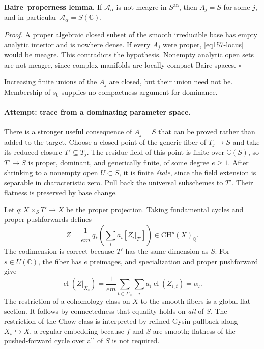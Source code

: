 \documentclass[11pt,a4paper]{article}
\newcommand{\Q}{\mathbb{Q}}
\newcommand{\C}{\mathbb{C}}
\numberwithin{equation}{section}
\begin{document}
\textbf{Baire--properness lemma.} If $\mathcal A_\alpha$ is not meagre in
$S^{\mathrm{an}}$, then $A_j=S$ for some $j$, and in particular
$\mathcal A_\alpha=S(\C)$.

\textit{Proof.} A proper algebraic closed subset of the smooth irreducible
base has empty analytic interior and is nowhere dense. If every $A_j$ were
proper, \eqref{eq157-locus} would be meagre. This contradicts the
hypothesis. Nonempty analytic open sets are not meagre, since complex
manifolds are locally compact Baire spaces. \hfill$\square$

Increasing finite unions of the $A_j$ are closed, but their union need not
be. Membership of $s_0$ supplies no compactness argument for dominance.

\paragraph{Attempt: trace from a dominating parameter space.}
There is a stronger useful consequence of $A_j=S$ that can be proved rather
than added to the target. Choose a closed point of the generic fiber of
$T_j\to S$ and take its reduced closure $T'\subseteq T_j$. The residue
field of this point is finite over $\C(S)$, so $T'\to S$ is proper,
dominant, and generically finite, of some degree $e\ge1$. After shrinking
to a nonempty open $U\subset S$, it is finite \emph{\'etale}, since the
field extension is separable in characteristic zero. Pull back the
universal subschemes to $T'$. Their flatness is preserved by base change.

Let $q:X\times_ST'\to X$ be the proper projection. Taking fundamental
cycles and proper pushforwards defines
\begin{equation}\label{eq157-trace}
 Z=\frac1{em}\,q_*\left(\sum_i a_i[Z_i|_{T'}]\right)
       \in\mathrm{CH}^p(X)_{\Q}.
\end{equation}
The codimension is correct because $T'$ has the same dimension as $S$.
For $s\in U(\C)$, the fiber has $e$ preimages, and specialization and
proper pushforward give
\[
 \operatorname{cl}(Z|_{X_s})
 =\frac1{em}\sum_{t\in T'_s}\sum_i a_i\operatorname{cl}(Z_{i,t})
 =\alpha_s.
\]
The restriction of a cohomology class on $X$ to the smooth fibers is a
global flat section. It follows by connectedness that equality holds on
\emph{all} of $S$. The restriction of the Chow class is interpreted by
refined Gysin pullback along $X_s\hookrightarrow X$, a regular embedding
because $f$ and $S$ are smooth; flatness of the pushed-forward cycle over
all of $S$ is not required.
\end{document}
